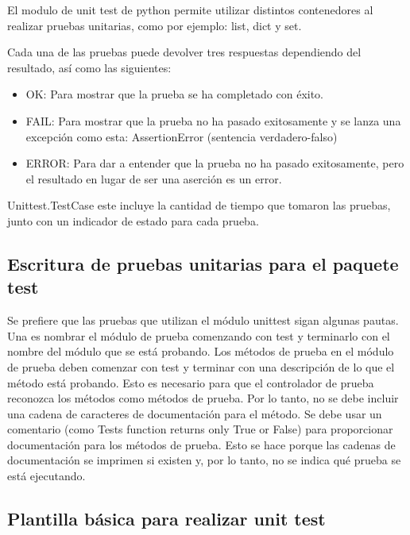 \documentclass[conference]{IEEEtran}
\begin{document}
El modulo de unit test de python permite utilizar distintos contenedores al realizar pruebas unitarias, como por ejemplo: list, dict y set.

Cada una de las pruebas puede devolver tres respuestas dependiendo del resultado, así como las siguientes:

\begin{itemize}
\item OK: Para mostrar que la prueba se ha completado con éxito.
\item FAIL: Para mostrar que la prueba no ha pasado exitosamente y se lanza una excepción como esta: AssertionError (sentencia verdadero-falso)
\item ERROR: Para dar a entender que la prueba no ha pasado exitosamente, pero el resultado en lugar de ser una aserción es un error.
\end{itemize}

Unittest.TestCase este incluye la cantidad de tiempo que tomaron las pruebas, junto con un indicador de estado para cada prueba. 

\subsection{Escritura de pruebas unitarias para el paquete test}

Se prefiere que las pruebas que utilizan el módulo unittest sigan algunas pautas. Una es nombrar el módulo de prueba comenzando con test y terminarlo con el nombre del módulo que se está probando. Los métodos de prueba en el módulo de prueba deben comenzar con test y terminar con una descripción de lo que el método está probando. Esto es necesario para que el controlador de prueba reconozca los métodos como métodos de prueba. Por lo tanto, no se debe incluir una cadena de caracteres de documentación para el método. Se debe usar un comentario (como Tests function returns only True or False) para proporcionar documentación para los métodos de prueba. Esto se hace porque las cadenas de documentación se imprimen si existen y, por lo tanto, no se indica qué prueba se está ejecutando.

\subsection{Plantilla básica para realizar unit test}
\end{document}
